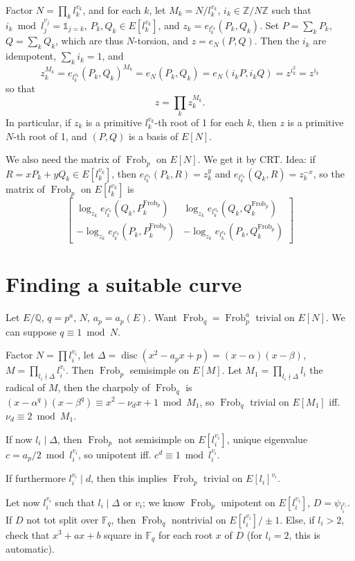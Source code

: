 \documentclass[12pt]{article}
\newcommand{\Z}{\mathbb{Z}}
\newcommand{\Q}{\mathbb{Q}}
\newcommand{\F}{\mathbb{F}}
\newcommand{\disc}{\operatorname{disc}}
\newcommand{\Frob}{\operatorname{Frob}}
\theoremstyle{definition}
\begin{document}
Factor $N = \prod_k l_k^{v_k}$, and for each $k$, let $M_k = N/l_k^{v_k}$, $i_k \in \Z/N\Z$ such that $i_k \bmod l_j^{v_j} = \mathds{1}_{j=k}$, $P_k, Q_k \in E[l_k^{v_k}]$, and $z_k = e_{l_k^{v_k}}(P_k,Q_k)$. Set $P = \sum_k P_k$, $Q = \sum_k Q_k$, which are thus $N$-torsion, and $z=e_N(P,Q)$. Then the $i_k$ are idempotent, $\sum_k i_k = 1$, and
\[ z_k^{M_k} = e_{l_k^{v_k}}(P_k,Q_k)^{M_k} = e_N(P_k,Q_k) = e_N(i_k P, i_k Q) = z ^{i_k^2} = z^{i_k} \]
so that
\[ z = \prod_k z_k^{M_k}. \]
In particular, if $z_k$ is a primitive $l_k^{v_k}$-th root of 1 for each $k$, then $z$ is a primitive $N$-th root of 1, and $(P,Q)$ is a basis of $E[N]$.

We also need the matrix of $\Frob_p$ on $E[N]$. We get it by CRT. Idea: if $R = x P_k + y Q_k \in E[l_k^{v_k}]$, then $e_{l_k^{v_k}}(P_k,R) = z_k^y$ and $e_{l_k^{v_k}}(Q_k,R) = z_k^{-x}$, so the matrix of $\Frob_p$ on $E[l_k^{v_k}]$ is
\[ \left[ \begin{matrix} \log_{z_k} e_{l_k^{v_k}}(Q_k,P_k^{\Frob_p}) & \log_{z_k} e_{l_k^{v_k}}(Q_k,Q_k^{\Frob_p}) \\ -\log_{z_k} e_{l_k^{v_k}}(P_k,P_k^{\Frob_p}) & -\log_{z_k} e_{l_k^{v_k}}(P_k,Q_k^{\Frob_p}) \end{matrix} \right] \]

\section{Finding a suitable curve}

Let $E/\Q$, $q=p^a$, $N$, $a_p=a_p(E)$. Want $\Frob_q = \Frob_p^a$ trivial on $E[N]$. We can suppose $q \equiv 1 \bmod N$.

Factor $N = \prod l_i^{v_i}$, let $\Delta = \disc(x^2-a_p x+p)=(x-\alpha)(x-\beta)$, $M = \prod_{l_i \nmid \Delta} l_i^{v_i}$. Then $\Frob_p$ semisimple on $E[M]$. Let $M_1 = \prod_{l_i \nmid \Delta} l_i$ the radical of $M$, then the charpoly of $\Frob_q$ is $(x-\alpha^q)(x-\beta^q) \equiv x^2-\nu_d x + 1 \bmod M_1$, so $\Frob_q$ trivial on $E[M_1]$ iff. $\nu_d \equiv 2 \bmod M_1$.

If now $l_i \mid \Delta$, then $\Frob_p$ not semisimple on $E[l_i^{v_i}]$, unique eigenvalue $c = a_p/2 \bmod l_i^{v_i}$, so unipotent iff. $c^d \equiv 1 \bmod l_i^{v_i}$.

If furthermore $l_i^{v_i} \mid d$, then this implies $\Frob_p$ trivial on $E[l_i]^{v_i}$.

Let now $l_i^{v_i}$ such that $l_i \mid \Delta$ or $v_i$; we know $\Frob_p$ unipotent on $E[l_i^{v_i}]$, $D=\psi_{l_i^{v_i}}$. If $D$ not tot split over $\F_q$, then $\Frob_q$ nontrivial on $E[l_i^{v_i}]/\pm1$. Else, if $l_i > 2$, check that $x^3+ax+b$ square in $\F_q$ for each root $x$ of $D$ (for $l_i=2$, this is automatic). 
\end{document}
